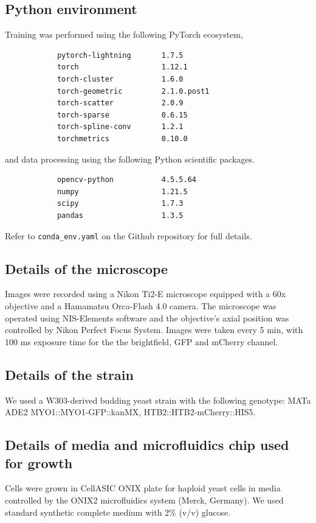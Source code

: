 \documentclass[10pt,conference,compsocconf,a4paper]{IEEEtran}
\begin{document}
	\subsection{Python environment}

		Training was performed using the following PyTorch ecosystem,
		\begin{verbatim}
			pytorch-lightning       1.7.5
			torch                   1.12.1
			torch-cluster           1.6.0
			torch-geometric         2.1.0.post1
			torch-scatter           2.0.9
			torch-sparse            0.6.15
			torch-spline-conv       1.2.1
			torchmetrics            0.10.0
		\end{verbatim}
		and data processing using the following Python scientific packages.
		\begin{verbatim}
			opencv-python           4.5.5.64
			numpy                   1.21.5
			scipy                   1.7.3
			pandas                  1.3.5
		\end{verbatim}

		Refer to \texttt{conda\_env.yaml} on the Github repository for full details.

	\subsection{Details of the microscope}
		
		Images were recorded using a Nikon Ti2-E microscope equipped with a 60x objective and a Hamamatsu Orca-Flash 4.0 camera.
		The microscope was operated using NIS-Elements software and the objective's axial position was controlled by Nikon
		Perfect Focus System. Images were taken every 5 min, with 100 ms exposure time for the the brightfield, GFP and mCherry
		channel.

	\subsection{Details of the strain}

		We used a W303-derived budding yeast strain with the following genotype: MATa ADE2 MYO1::MYO1-GFP::kanMX, 
		HTB2::HTB2-mCherry::HIS5.

	\subsection{Details of media and microfluidics chip used for growth}

		Cells were grown in CellASIC ONIX plate for haploid yeast cells in media controlled by the ONIX2 microfluidics system
		(Merck, Germany). We used standard synthetic complete medium with 2\% (v/v) glucose.
\end{document}
